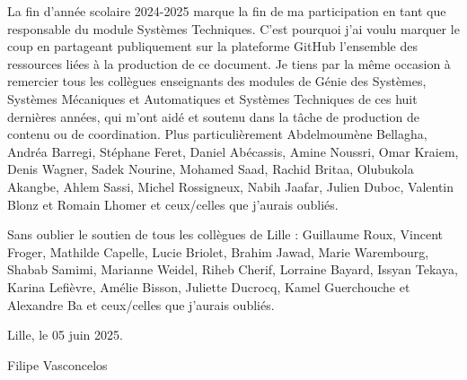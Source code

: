 La fin d'année scolaire 2024-2025 marque la fin de ma participation en tant que 
responsable du module \og Systèmes Techniques\fg. C'est pourquoi
j'ai voulu marquer le coup en partageant publiquement sur la plateforme GitHub
l'ensemble des ressources liées à la production de ce document.
Je tiens par la même occasion à remercier tous les collègues enseignants des modules
de \og Génie des Systèmes\fg, \og Systèmes Mécaniques et Automatiques\fg
et \og Systèmes Techniques\fg
de ces huit dernières années, qui m'ont aidé et soutenu dans la tâche de production
de contenu ou de coordination. Plus particulièrement
Abdelmoumène Bellagha, Andréa Barregi, Stéphane Feret, Daniel Abécassis,
Amine Noussri, Omar Kraiem, Denis Wagner, Sadek Nourine, Mohamed Saad,
Rachid Britaa, Olubukola Akangbe, Ahlem Sassi, Michel Rossigneux,
Nabih Jaafar, Julien Duboc, Valentin Blonz et Romain Lhomer
et ceux/celles que j'aurais oubliés.

Sans oublier le soutien de tous les collègues de Lille :
Guillaume Roux, Vincent Froger, Mathilde Capelle, Lucie Briolet,
Brahim Jawad, Marie Warembourg, Shabab Samimi, Marianne Weidel,
Riheb Cherif, Lorraine Bayard, Issyan Tekaya, Karina Lefièvre, Amélie Bisson,
Juliette Ducrocq, Kamel Guerchouche et Alexandre Ba et ceux/celles que j'aurais oubliés.

\hspace{1cm}
\hfill Lille, le 05 juin 2025.

\hfill Filipe Vasconcelos
